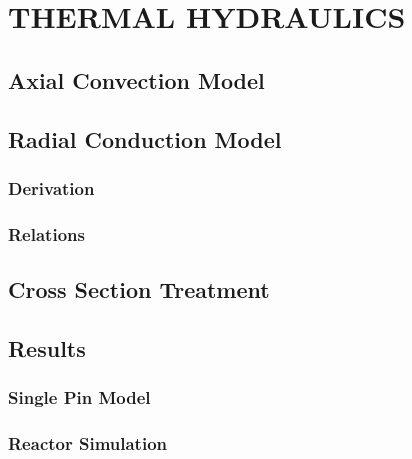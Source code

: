 \chapter{THERMAL HYDRAULICS}
\label{ch:thermalHydraulics}

\section{Axial Convection Model}
\section{Radial Conduction Model}
  \subsection{Derivation}
  \subsection{Relations}
\section{Cross Section Treatment}
\section{Results}
  \subsection{Single Pin Model}
  \subsection{Reactor Simulation}
